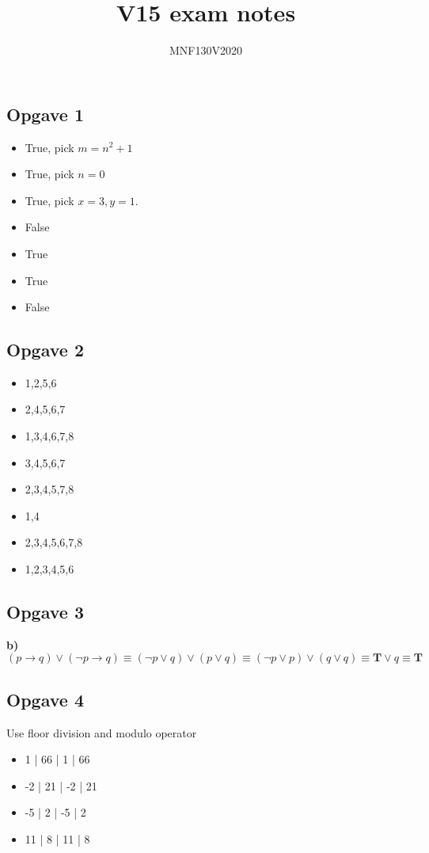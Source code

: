 \documentclass[12pt]{article}
\title{\huge V15 exam notes}
\author{\LARGE MNF130V2020}
\begin{document}
\subsection{Opgave 1}

\begin{itemize}
\item True, pick $m = n^2+1$
\item True, pick $n = 0$
\item True, pick $x = 3, y = 1$. 
\item False
\item True
\item True
\item False
\end{itemize}

\subsection{Opgave 2}
\begin{itemize}
\item 1,2,5,6
\item 2,4,5,6,7
\item 1,3,4,6,7,8
\item 3,4,5,6,7
\item 2,3,4,5,7,8
\item 1,4
\item 2,3,4,5,6,7,8
\item 1,2,3,4,5,6
\end{itemize}

\subsection{Opgave 3}

\textbf{b)} \\
$$
(p \rightarrow q) \vee (\neg p \rightarrow q) \equiv (\neg p \vee q) \vee (p \vee q)
\equiv (\neg p \vee p) \vee (q \vee q) \equiv \textbf{T} \vee q \equiv \textbf{T}
$$

\subsection{Opgave 4}

Use floor division and modulo operator \\
\begin{itemize}
\item 1 | 66 | 1 | 66
\item -2 | 21 | -2 | 21
\item  -5 | 2 | -5 | 2
\item 11 | 8 | 11 | 8
\end{itemize}
\end{document}
